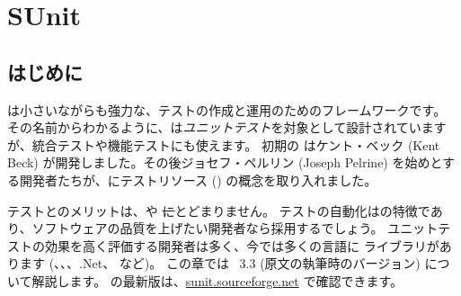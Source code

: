 \documentclass[a4paper,10pt,twoside]{book}
\begin{document}
	\sloppy
\fi
\chapter{SUnit}

\section{はじめに}


 は小さいながらも強力な、テストの作成と運用のためのフレームワークです。
その名前からわかるように、\sunit は\emph{ユニットテスト}を対象として設計されていますが、統合テストや機能テストにも使えます。
初期の \sunit はケント・ベック (Kent Beck) が開発しました。その後ジョセフ・ペルリン (Joseph Pelrine) を始めとする開発者たちが、\sunit にテストリソース () の概念を取り入れました。

テストとのメリットは、\pharo や \st にとどまりません。
テストの自動化はの特徴であり、ソフトウェアの品質を上げたい開発者なら採用するでしょう。 
ユニットテストの効果を高く評価する開発者は多く、今では多くの言語に \xUnit ライブラリがあります (、、、.Net、 など)。
この章では \SUnit~3.3 (原文の執筆時のバージョン) について解説します。
\sunit の最新版は、\url{sunit.sourceforge.net} で確認できます。
\end{document}
